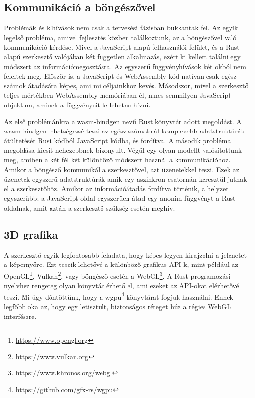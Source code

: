 \subsection{Kommunikáció a böngészővel}

Problémák és kihívások nem csak a tervezési fázisban bukkantak fel. Az egyik legelső probléma,
amivel fejlesztés közben találkoztunk, az a böngészővel való kommunikáció kérdése. Mivel a
JavaScript alapú felhasználói felület, és a Rust alapú szerkesztő valójában két független
alkalmazás, ezért ki kellett találni egy módszert az információmegosztásra. Az egyszerű
függvényhívások két okból nem feleltek meg. Először is, a JavaScript és WebAssembly kód natívan
csak egész számok átadására képes, ami mi céljainkhoz kevés. Másodszor, mivel a szerkesztő teljes
mértékben WebAssembly memóriában él, nincs semmilyen JavaScript objektum, aminek a függvényeit le
lehetne hívni.

Az első problémánkra a wasm-bindgen nevű Rust könyvtár adott megoldást. A wasm-bindgen lehetségessé
teszi az egész számoknál komplexebb adatstruktúrák átültetését Rust kódból JavaScript kódba, és
fordítva. A második probléma megoldása kicsit nehezebbnek bizonyult. Végül egy olyan
modellt valósítottunk meg, amiben a két fél két különböző módszert használ a kommunikációhoz.
Amikor a böngésző kommunikál a szerkesztővel, azt üzenetekkel teszi. Ezek az üzenetek egyszerű
adatstruktúrák amik egy aszinkron csatornán keresztül jutnak el a szerkesztőhöz. Amikor az
információátadás fordítva történik, a helyzet egyszerűbb: a JavaScript oldal egyszerűen átad egy
anonim függvényt a Rust oldalnak, amit aztán a szerkesztő szükség esetén meghív.

\subsection{3D grafika}

A szerkesztő egyik legfontosabb feladata, hogy képes legyen kirajzolni a jelenetet a képernyőre.
Ezt teszik lehetővé a különböző grafikus API-k, mint például az
OpenGL\footnote{\url{https://www.opengl.org}}, Vulkan\footnote{\url{https://www.vulkan.org}},
vagy böngésző esetén a WebGL\footnote{\url{https://www.khronos.org/webgl}}.
A Rust programozási nyelvhez rengeteg olyan könyvtár érhető el, ami ezeket az API-okat elérhetővé
teszi. Mi úgy döntöttünk, hogy a wgpu\footnote{\url{https://github.com/gfx-rs/wgpu}} könyvtárat fogjuk
használni. Ennek legfőbb oka az, hogy egy letisztult, biztonságos réteget húz a régies WebGL
interfészre.

